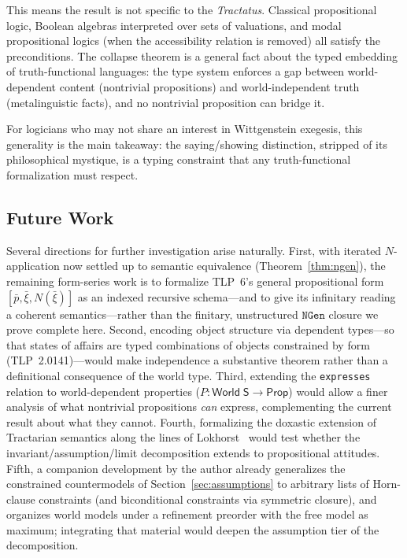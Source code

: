 \documentclass[jsl,bibother]{asl}
\theoremstyle{definition}
\theoremstyle{remark}
\newcommand{\Sach}{\mathsf{S}}
\newcommand{\World}{\mathsf{World}}
\newcommand{\Prop}{\mathsf{Prop}}
\begin{document}
This means the result is not specific to the
\emph{Tractatus}.  Classical propositional logic, Boolean
algebras interpreted over sets of valuations, and modal
propositional logics (when the accessibility relation is
removed) all satisfy the preconditions.  The collapse theorem
is a general fact about the typed embedding of truth-functional
languages: the type system enforces a gap between
world-dependent content (nontrivial propositions) and
world-independent truth (metalinguistic facts), and no
nontrivial proposition can bridge it.

For logicians who may not share an interest in Wittgenstein
exegesis, this generality is the main takeaway: the
saying/showing distinction, stripped of its philosophical
mystique, is a typing constraint that any truth-functional
formalization must respect.

\subsection{Future Work}
\label{sec:future}

Several directions for further investigation arise naturally.
First, with iterated $N$-application now settled up to
semantic equivalence (Theorem~\ref{thm:ngen}), the remaining
form-series work is to formalize TLP~6's general propositional
form $[\bar{p}, \bar{\xi}, N(\bar{\xi})]$ as an indexed
recursive schema---and to give its infinitary reading a
coherent semantics---rather than the finitary, unstructured
$\mathtt{NGen}$ closure we prove complete here.
Second, encoding object structure via dependent types---so
that states of affairs are typed combinations of objects
constrained by form (TLP~2.0141)---would make independence
a substantive theorem rather than a definitional consequence
of the world type.
Third, extending the \texttt{expresses} relation to
world-dependent properties ($P : \World\;\Sach \to \Prop$)
would allow a finer analysis of what nontrivial propositions
\emph{can} express, complementing the current result about
what they cannot.
Fourth, formalizing the doxastic extension of Tractarian
semantics along the lines of Lokhorst~\cite{lokhorst1988}
would test whether the invariant/assumption/limit decomposition
extends to propositional attitudes.
Fifth, a companion development by the author already generalizes
the constrained countermodels of Section~\ref{sec:assumptions}
to arbitrary lists of Horn-clause constraints (and biconditional
constraints via symmetric closure), and organizes world models
under a refinement preorder with the free model as maximum;
integrating that material would deepen the assumption tier of
the decomposition.
\end{document}
